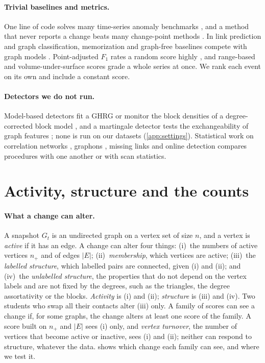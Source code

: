 \documentclass[11pt]{article}
\theoremstyle{dsplain}
\theoremstyle{definition}
\begin{document}
\paragraph{Trivial baselines and metrics.} One line of code solves many time-series anomaly benchmarks
\citep{wu2021current}, and a method that never reports a change beats many change-point methods
\citep{vandenburg2020evaluation}. In link prediction and graph classification, memorization and graph-free
baselines compete with graph models \citep{poursafaei2022towards,errica2020fair}. Point-adjusted $F_1$
rates a random score highly \citep{kim2022towards}, and range-based and volume-under-surface scores
\citep{tatbul2018precision,paparrizos2022volume} grade a whole series at once. We rank each event on its
own and include a constant score.

\paragraph{Detectors we do not run.} Model-based detectors fit a GHRG \citep{peel2015detecting} or
monitor the block densities of a degree-corrected block model \citep{wilson2019modeling}, and a martingale
detector tests the exchangeability of graph features \citep{ho2026detecting}; none is run on our datasets
(\cref{app:settings}). Statistical work on correlation networks
\citep{barnett2016change,cribben2017estimating}, graphons \citep{zhao2019change}, missing links
\citep{enikeeva2025change} and online detection \citep{yu2024network} compares procedures with one another
or with scan statistics.

\section{Activity, structure and the counts}
\label{sec:control}

\paragraph{What a change can alter.} A snapshot $G_t$ is an undirected graph on a vertex set of size $n$,
and a vertex is \emph{active} if it has an edge. A change can alter four things: (i)~the numbers of active
vertices $n_+$ and of edges $|E|$; (ii)~\emph{membership}, which vertices are active; (iii)~the
\emph{labelled structure}, which labelled pairs are connected, given (i) and (ii); and (iv)~the
\emph{unlabelled structure}, the properties that do not depend on the vertex labels and are not fixed by
the degrees, such as the triangles, the degree assortativity \citep{newman2002assortative} or the blocks.
\emph{Activity} is (i) and (ii); \emph{structure} is (iii) and (iv). Two students who swap all their contacts alter (iii) only. A family of scores
can see a change if, for some graphs, the change alters at least one score of the family. A score built on
$n_+$ and $|E|$ sees (i) only, and \emph{vertex turnover}, the number of vertices that become active or
inactive, sees (i) and (ii); neither can respond to structure, whatever the data.  shows
which change each family can see, and where we test it.
\end{document}
